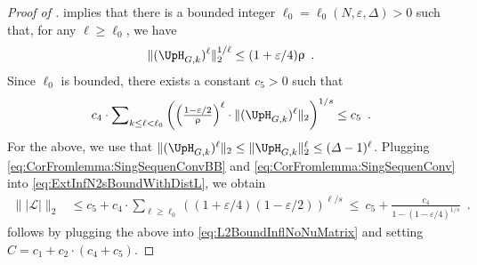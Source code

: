 \documentclass[11pt,reqno]{amsart}
\numberwithin{equation}{section}
\newcommand{\cL}{{\mathcal{L}}}
\newcommand{\applegreen}[1]{ {\color{applegreen}#1}}
\newcommand{\blue}[1]{{\color{blue}#1}}
\newcommand{\bluepigment}[1]{{\color{blue(pigment)}#1}}
\newcommand{\cadmiumgreen}[1]{{\color{cadmiumgreen}#1}}
\newcommand{\darkmagenta}[1]{{\color{darkmagenta}#1}}
\newcommand{\goldenbrown}[1]{{\color{goldenbrown}#1}}
\newcommand{\rosegold}[1]{{\color{rosegold}#1}}
\newcommand{\maxDeg}{{\Delta}}
\newcommand{\pfs}{\darkmagenta{s}}
\newcommand{\norm}[2]{\goldenbrown{\|} #1 \goldenbrown{\|}_{#2}}
\newcommand{\nnorm}[3]{\goldenbrown{\|} #1\goldenbrown{\|}^{#2}_{#3}}
\newcommand{\abs}[1]{\blue{|}#1\blue{|}}
\newcommand{\NBMatrix}{\cadmiumgreen{\UpH}_{G,\kk}}
\renewcommand{\applegreen}[1]{#1}
\renewcommand{\blue}[1]{#1}
\renewcommand{\bluepigment}[1]{#1}
\renewcommand{\cadmiumgreen}[1]{#1}
\renewcommand{\darkmagenta}[1]{#1}
\renewcommand{\goldenbrown}[1]{#1}
\renewcommand{\rosegold}[1]{#1}
\newcommand{\kk}{\bluepigment{k}}
\newcommand{\kell}{{\color{green(pigment)}\ell}}%
\renewcommand{\kk}{k}
\renewcommand{\kell}{\ell}
\newcommand{\ExtdInfMatrix}{\rosegold{\cL}}
\newcommand{\SingBound}{\uprho}
\begin{document}
\begin{proof}[Proof of ]
  implies that there is a bounded integer $\ell_0=\ell_0(N,\varepsilon, \maxDeg)>0$ such that, for any $\kell\geq \ell_0$, 
 we have 
\begin{align}\label{eq:CorFromlemma:SingSequenConv}
\nnorm{ (\NBMatrix)^{\kell}}{1/\kell}{2}
% 
\leq (1+\varepsilon/4) \SingBound\enspace. 
\end{align}
% 
Since $\ell_0$ is bounded, there exists a constant $c_5>0$ such that 
\begin{align}\label{eq:CorFromlemma:SingSequenConvBB}
{c}_4\cdot \sum\nolimits_{k \leq \kell < \ell_0} 
\left(
 {\textstyle \left(\frac{1-\varepsilon/2}{\SingBound}\right)^{\kell}} \cdot 
\norm{ (\NBMatrix)^{\kell}}{2}   \right)^{1/\pfs} \leq c_5\enspace. 
\end{align}%
For the above, we use that $\norm{ (\NBMatrix)^{\kell}}{2} \leq \nnorm{\NBMatrix}{\kell}{2}\leq (\maxDeg-1)^{\kell}$. 
%
Plugging \eqref{eq:CorFromlemma:SingSequenConvBB} and \eqref{eq:CorFromlemma:SingSequenConv} into \eqref{eq:ExtInfN2sBoundWithDistL}, we obtain
\begin{align}%
\norm{ \abs{ \ExtdInfMatrix } }{2}  &\leq 
c_5+ {c}_4\cdot \sum\nolimits_{\kell\geq \ell_0} 
\left( {\textstyle (1+\varepsilon/4)(1-\varepsilon/2) } 
 \right)^{\kell/\pfs} %
 \ \leq \ c_5+\frac{c_4}{1-(1-\varepsilon/4)^{1/\pfs}}
 \enspace. \nonumber
\end{align}
 follows by plugging the above into \eqref{eq:L2BoundInflNoNuMatrix} and 
setting $C=c_1+c_2\cdot (c_4+c_5)$. 
\end{proof}
\end{document}

